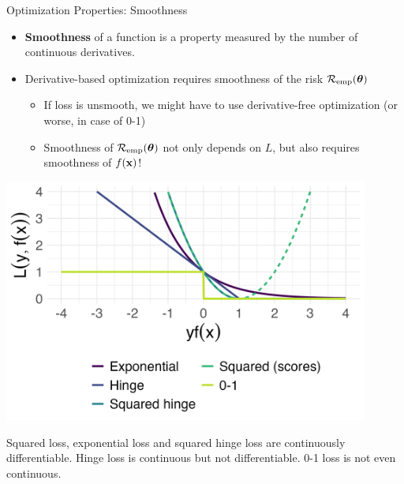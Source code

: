 \documentclass[11pt,compress,t,notes=noshow, xcolor=table]{beamer}
\begin{document}

\begin{vbframe}{Optimization Properties: Smoothness}


\begin{itemize}
  \small
  \item \textbf{Smoothness} of a function is a property measured by 
  the number of continuous derivatives. 
  \item Derivative-based optimization requires smoothness of the 
  risk $\mathcal{R}_{\text{emp}}(\bm{\theta})$ 
  \begin{itemize}
    \small
    \item If loss is unsmooth, we might have to use derivative-free optimization (or worse, in case of 0-1)
    \item Smoothness of $\mathcal{R}_{\text{emp}}(\bm{\theta})$ not only depends on $L$, but also requires smoothness of $f(\mathbf{x})$! 
  \end{itemize}
\end{itemize}

\vfill

\begin{minipage}[c]{0.4\textwidth}
  \includegraphics[width=0.9\textwidth]{figure/overview_classif.png}
\end{minipage}%
\begin{minipage}[c]{0.05\textwidth}
  \phantom{foo}
\end{minipage}%
\begin{minipage}[c]{0.55\textwidth}
  \footnotesize \raggedright
  Squared loss, exponential loss and squared hinge loss are continuously 
  differentiable. Hinge loss is continuous but not differentiable. 
  0-1 loss is not even continuous.
\end{minipage}%


\end{vbframe}
\end{document}
